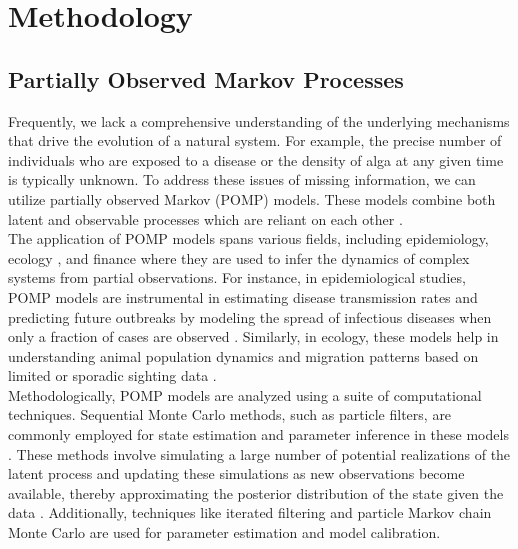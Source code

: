 \documentclass[12pt]{article}
\begin{document}
\section{Methodology}
\label{sec:meth}
\subsection{Partially Observed Markov Processes}
Frequently, we lack a comprehensive understanding of the underlying mechanisms that drive the evolution of a natural system. For example, the precise number of individuals who are exposed to a disease or the density of alga at any given time is typically unknown. To address these issues of missing information, we can utilize partially observed Markov (POMP) models. These models combine both latent and observable processes which are reliant on each other \citep{bhadra2011malaria}.\\

The application of POMP models spans various fields, including epidemiology, ecology  \citep{king2022markov}, and finance \citep{welton2005estimation} where they are used to infer the dynamics of complex systems from partial observations. For instance, in epidemiological studies, POMP models are instrumental in estimating disease transmission rates and predicting future outbreaks by modeling the spread of infectious diseases when only a fraction of cases are observed \citep{xue2020data}. Similarly, in ecology, these models help in understanding animal population dynamics and migration patterns based on limited or sporadic sighting data \citep{wood2001partially}.\\

Methodologically, POMP models are analyzed using a suite of computational techniques. Sequential Monte Carlo methods, such as particle filters, are commonly employed for state estimation and parameter inference in these models \citep{bhadra2011malaria}. These methods involve simulating a large number of potential realizations of the latent process and updating these simulations as new observations become available, thereby approximating the posterior distribution of the state given the data \citep{King2016}. Additionally, techniques like iterated filtering and particle Markov chain Monte Carlo are used for parameter estimation and model calibration.\\
\end{document}
